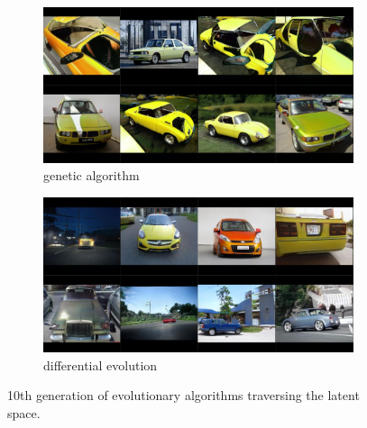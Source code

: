 \documentclass[12pt,a4paper,openany]{book}
\begin{document}
\begin{figure}[H]
\centering
\begin{subfigure}[b]{1.0\textwidth}
   \includegraphics[width=1\linewidth]{GA_yellowcar_10.PNG}
   \caption{genetic algorithm}
   \label{fig:Ng1} 
\end{subfigure}

\begin{subfigure}[b]{1.0\textwidth}
   \includegraphics[width=1\linewidth]{DE_yellowcar_10.PNG}
   \caption{differential evolution}
   \label{fig:Ng2}
\end{subfigure}

\caption[Two numerical solutions]{10th generation of evolutionary algorithms traversing the latent space.}
\end{figure}

\newpage
\end{document}
